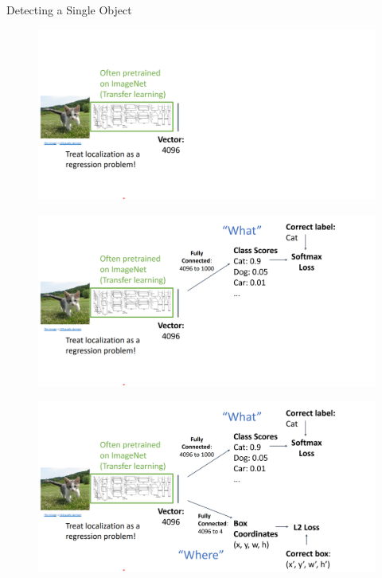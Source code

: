 \begin{frame}[allowframebreaks]{Detecting a Single Object}
\begin{figure}
\centering
\includegraphics[width=1.0\textwidth,height=1.0\textheight,keepaspectratio]{images/obj-det/object_3.png}
\end{figure}

\framebreak

\begin{figure}
\centering
\includegraphics[width=1.0\textwidth,height=1.0\textheight,keepaspectratio]{images/obj-det/object_4.png}
\end{figure}

\framebreak

\begin{figure}
\centering
\includegraphics[width=1.0\textwidth,height=1.0\textheight,keepaspectratio]{images/obj-det/object_5.png}
\end{figure}


\end{frame}
